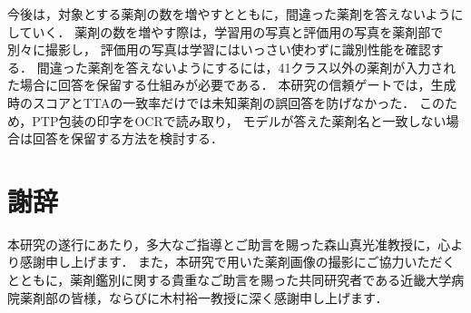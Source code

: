 \documentclass[uplatex,dvipdfmx]{jsarticle}
\begin{document}
今後は，対象とする薬剤の数を増やすとともに，間違った薬剤を答えないようにしていく．
薬剤の数を増やす際は，学習用の写真と評価用の写真を薬剤部で別々に撮影し，
評価用の写真は学習にはいっさい使わずに識別性能を確認する．
間違った薬剤を答えないようにするには，41クラス以外の薬剤が入力された場合に回答を保留する仕組みが必要である．
本研究の信頼ゲートでは，生成時のスコアとTTAの一致率だけでは未知薬剤の誤回答を防げなかった．
このため，PTP包装の印字をOCRで読み取り，
モデルが答えた薬剤名と一致しない場合は回答を保留する方法を検討する．

\clearpage

\section*{謝辞}

本研究の遂行にあたり，多大なご指導とご助言を賜った森山真光准教授に，心より感謝申し上げます．
また，本研究で用いた薬剤画像の撮影にご協力いただくとともに，薬剤鑑別に関する貴重なご助言を賜った共同研究者である近畿大学病院薬剤部の皆様，ならびに木村裕一教授に深く感謝申し上げます．

\clearpage
{}

{\footnotesize
\raggedright


}
\end{document}
